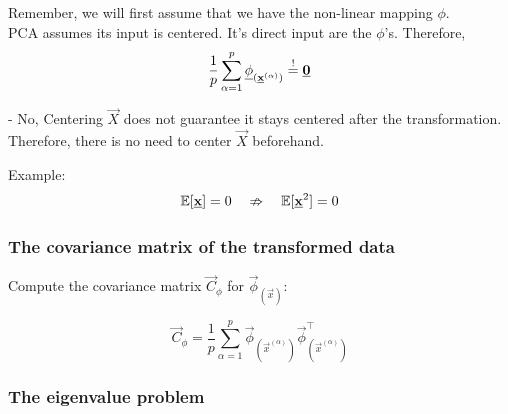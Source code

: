 \begin{frame}{\subsubsecname}

Remember, we will first assume that we have the non-linear mapping $\phi$.\\

PCA assumes its input is centered.
It's direct input are the $\phi$'s. Therefore,
\begin{equation}
\frac{1}{p} \sum^{p}_{\alpha=1} \underline{\mathbf{\phi}}_{(\underline{\mathbf{x}}^{(\alpha)})} \stackrel{\mathrm{!}}{=} \underline{\mathbf{0}}
\end{equation}


\pause

- No, Centering $\vec X$ does not guarantee it stays centered after the transformation.
Therefore, there is no need to center $\vec X$ beforehand.

Example:
\begin{equation}
\mathbb{E}[\underline{\mathbf{x}}] = 0 \quad \nRightarrow \quad \mathbb{E}[\underline{\mathbf{x}}^2] = 0
\end{equation}

\end{frame}

\subsubsection{The covariance matrix of the transformed data}

\begin{frame}{\subsubsecname}

Compute the covariance matrix $\vec C_{\phi}$ for $\vec{\phi}_{(\vec{x})}$:


\begin{equation} \label{eq:cov}
\vec C_{\phi} = \frac{1}{p} \sum_{\alpha=1}^{p} \vec{\phi}_{(\vec{x}^{(\alpha)})} \vec{\phi}^{\top}_{(\vec{x}^{(\alpha)})}
\end{equation}

\end{frame}

\subsubsection{The eigenvalue problem}

